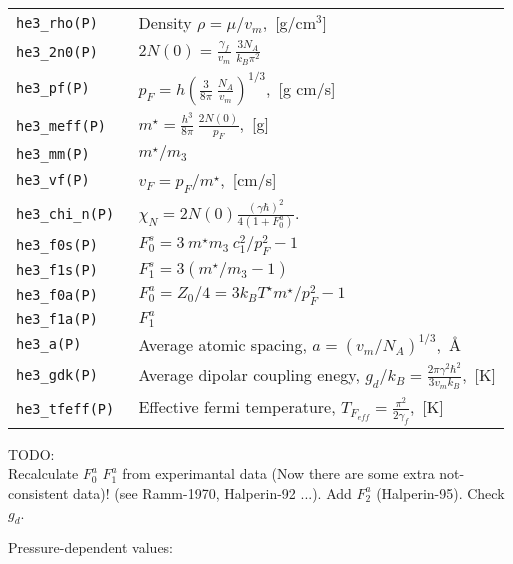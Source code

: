 \documentclass[a4paper]{article}
\begin{document}
\medskip
\noindent\begin{tabular}{lp{12.5cm}}
\tt he3\_rho(P)    & Density $\rho = \mu/v_m$,~[g/cm$^3$]\\
\tt he3\_2n0(P)    & $\displaystyle 2N(0) = \frac{\gamma_f}{v_m}
                     \ \frac{3 N_A}{k_B \pi^2}$\\
\tt he3\_pf(P)     & $\displaystyle p_F = h \left(\frac{3}{8\pi}
                     \ \frac{N_A}{v_m}\right)^{1/3}$,~[g cm/s]\\
\tt he3\_meff(P)   & $\displaystyle m^\star = \frac{h^3}{8\pi}
                     \ \frac{2N(0)}{p_F}$,~[g]\\
\tt he3\_mm(P)     &$m^\star/m_3$\\
\tt he3\_vf(P)     &$\displaystyle v_F = p_F/m^\star$,~[cm/s]\\
\tt he3\_chi\_n(P) &$\displaystyle \chi_{N} = 2N(0) \frac{(\gamma\hbar)^2}{4(1 + F_0^a)}$.\\
\tt he3\_f0s(P)    &$\displaystyle F_0^s = 3\ m^\star m_3\ c_1^2 / p_F^2 - 1$\\
\tt he3\_f1s(P)    &$\displaystyle F_1^s = 3(m^\star/m_3 - 1)$\\
\tt he3\_f0a(P)    &$\displaystyle F_0^a = Z_0/4 = 3 k_B T^\star m^\star / p_F^2 - 1$\\
\tt he3\_f1a(P)    &$\displaystyle F_1^a$\\

\tt he3\_a(P)      &Average atomic spacing,
                    $\displaystyle a=(v_m/N_A)^{1/3}$,~\AA\\
\tt he3\_gdk(P)    &Average dipolar coupling enegy,
                    $\displaystyle g_d/k_B = \frac{2\pi\gamma^2\hbar^2}{3 v_m k_B}$,~[K]\\
\tt he3\_tfeff(P)  &Effective fermi temperature,
                    $\displaystyle T_{F_{eff}} = \frac{\pi^2}{2\gamma_f}$,~[K]\\
\end{tabular}
\medskip

\noindent TODO:\\
Recalculate $F_0^a$ $F_1^a$ from experimantal data (Now there are some extra
not-consistent data)!
(see Ramm-1970, Halperin-92 ...). Add $F_2^a$ (Halperin-95). 
Check $g_d$.

\eject
Pressure-dependent values:
\medskip

{\small}

\eject
\end{document}
